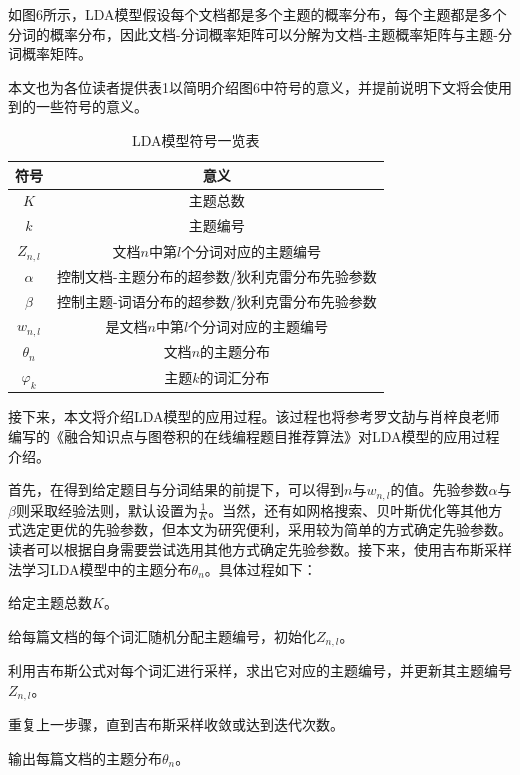 如图6所示，LDA模型假设每个文档都是多个主题的概率分布，每个主题都是多个分词的概率分布，因此文档-分词概率矩阵可以分解为文档-主题概率矩阵与主题-分词概率矩阵。

本文也为各位读者提供表1以简明介绍图6中符号的意义，并提前说明下文将会使用到的一些符号的意义。

\begin{table}[htbp]
    \centering
    \label{table041937}
    \caption{LDA模型符号一览表}
    \begin{tabular}{@{}cc@{}}
    \toprule
    符号            & 意义                        \\ \midrule
    $K$           & 主题总数                      \\
    $k$           & 主题编号                      \\
    $Z_{n,l}$     & 文档$n$中第$l$个分词对应的主题编号      \\
    $\alpha$      & 控制文档-主题分布的超参数/狄利克雷分布先验参数 \\
    $\beta$       & 控制主题-词语分布的超参数/狄利克雷分布先验参数 \\
    $w_{n,l}$     & 是文档$n$中第$l$个分词对应的主题编号     \\
    $\theta _{n}$ & 文档$n$的主题分布                \\
    $\varphi_{k}$ & 主题$k$的词汇分布                \\ \bottomrule
    \end{tabular}
\end{table}

接下来，本文将介绍LDA模型的应用过程。该过程也将参考罗文劼与肖梓良老师编写的《融合知识点与图卷积的在线编程题目推荐算法》\cite{LuoRongHeZhiShiDianYuTuJuanJiDeZaiXianBianChengTiMuTuiJianSuanFa}对LDA模型的应用过程介绍。

首先，在得到给定题目与分词结果的前提下，可以得到$n$与$w_{n,l}$的值。先验参数$\alpha$与$\beta$则采取经验法则，默认设置为$\frac{1}{K}$。当然，还有如网格搜索、贝叶斯优化等其他方式选定更优的先验参数，但本文为研究便利，采用较为简单的方式确定先验参数。读者可以根据自身需要尝试选用其他方式确定先验参数。接下来，使用吉布斯采样法学习LDA模型中的主题分布$\theta _{n}$。具体过程如下：

\begin{mgAlgorithm}[吉布采样学习LDA模型过程]
    \item 给定主题总数$K$。
    \item 给每篇文档的每个词汇随机分配主题编号，初始化$Z_{n,l}$。
    \item 利用吉布斯公式对每个词汇进行采样，求出它对应的主题编号，并更新其主题编号$Z_{n,l}$。
    \item 重复上一步骤，直到吉布斯采样收敛或达到迭代次数。
    \item 输出每篇文档的主题分布$\theta _{n}$。
\end{mgAlgorithm}

